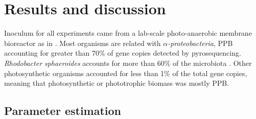 \newpage
\section{Results and discussion}
Inoculum for all experiments came from a lab-scale photo-anaerobic membrane bioreactor as in \cite{hulsen2016,hulsen2016a}. Most organisms are related with $\alpha$\textit{-proteobacteria}, PPB accounting for greater than 70\% of gene copies detected by pyrosequencing. \textit{Rhodobacter sphaeroides} accounts for more than 60\% of the microbiota \cite{hulsen2016}. Other photosynthetic organisms accounted for less than 1\% of the total gene copies, meaning that photosynthetic or phototrophic biomass was mostly PPB. 









\subsection{Parameter estimation}

